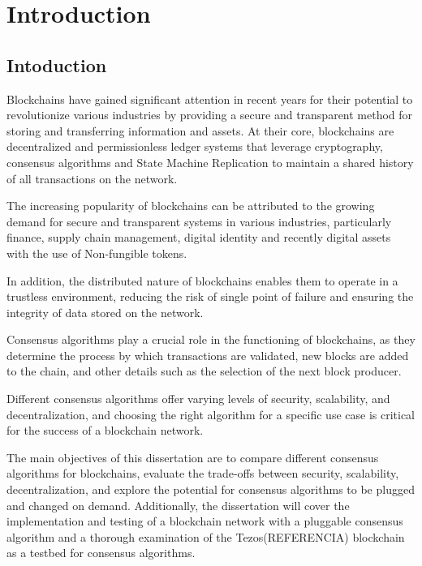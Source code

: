 \chapter{Introduction}
\label{chap:int}





\section{Intoduction}
Blockchains have gained significant attention in recent years for their potential to revolutionize various industries by providing a secure and transparent method for storing and transferring information and assets.
At their core, blockchains are decentralized and permissionless ledger systems that leverage cryptography, consensus algorithms and State Machine Replication to maintain a shared history of all transactions on the network.

The increasing popularity of blockchains can be attributed to the growing demand for secure and transparent systems in various industries, particularly finance, supply chain management, digital identity and recently digital assets with the use of Non-fungible tokens.

In addition, the distributed nature of blockchains enables them to operate in a trustless environment, reducing the risk of single point of failure and ensuring the integrity of data stored on the network.

Consensus algorithms play a crucial role in the functioning of blockchains, as they determine the process by which transactions are validated, new blocks are added to the chain, and other details such as the selection of the next block producer.

Different consensus algorithms offer varying levels of security, scalability, and decentralization, and choosing the right algorithm for a specific use case is critical for the success of a blockchain network.

The main objectives of this dissertation are to compare different consensus algorithms for blockchains, evaluate the trade-offs between security, scalability, decentralization, and explore the potential for consensus algorithms to be plugged and changed on demand.
Additionally, the dissertation will cover the implementation and testing of a blockchain network with a pluggable consensus algorithm and a thorough examination of the Tezos(REFERENCIA) blockchain as a testbed for consensus algorithms.

